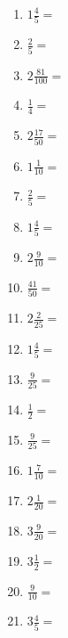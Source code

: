 \documentclass[12pt]{article}
\begin{document}
\begin{enumerate}
\newpage
\item \large $ 1 \frac{4}{5} = $ \vspace{1.5cm}
\item \large $ \frac{2}{5} = $ \vspace{1.5cm}
\item \large $ 2 \frac{81}{100} = $ \vspace{1.5cm}
\item \large $ \frac{1}{4} = $ \vspace{1.5cm}
\item \large $ 2 \frac{17}{50} = $ \vspace{1.5cm}
\item \large $ 1 \frac{1}{10} = $ \vspace{1.5cm}
\item \large $ \frac{2}{5} = $ \vspace{1.5cm}
\item \large $ 1 \frac{4}{5} = $ \vspace{1.5cm}
\item \large $ 2 \frac{9}{10} = $ \vspace{1.5cm}
\item \large $ \frac{41}{50} = $ \vspace{1.5cm}
\newpage
\item \large $ 2 \frac{2}{25} = $ \vspace{1.5cm}
\item \large $ 1 \frac{4}{5} = $ \vspace{1.5cm}
\item \large $ \frac{9}{25} = $ \vspace{1.5cm}
\item \large $ \frac{1}{2} = $ \vspace{1.5cm}
\item \large $ \frac{9}{25} = $ \vspace{1.5cm}
\item \large $ 1 \frac{7}{10} = $ \vspace{1.5cm}
\item \large $ 2 \frac{1}{20} = $ \vspace{1.5cm}
\item \large $ 3 \frac{9}{20} = $ \vspace{1.5cm}
\item \large $ 3 \frac{1}{2} = $ \vspace{1.5cm}
\item \large $ \frac{9}{10} = $ \vspace{1.5cm}
\newpage
\item \large $ 3 \frac{4}{5} = $ \vspace{1.5cm}

\end{enumerate}
\end{document}
